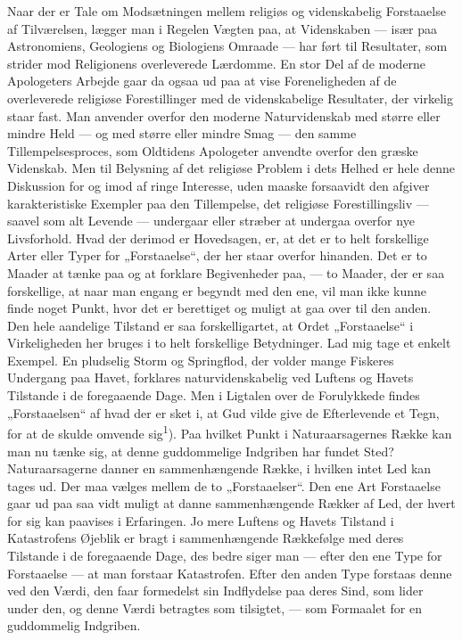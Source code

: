 \documentclass[12pt,a4paper,openany]{book}
\newcommand{\opage}[1]{\marginnote{\footnotesize\textit{[#1]}}}
\begin{document}
Naar der er Tale om Modsætningen mellem religiøs og videnskabelig
Forstaaelse af Tilværelsen, lægger man i Regelen Vægten paa, at
Videnskaben --- især paa Astronomiens, Geologiens og Biologiens Omraade
--- har ført til Resultater, som strider mod Religionens overleverede
Lærdomme. En stor Del af de moderne Apologeters Arbejde gaar da ogsaa ud
paa at vise Foreneligheden af de overleverede religiøse Forestillinger
med de videnskabelige Resultater, der virkelig staar fast. Man anvender
overfor den moderne Naturvidenskab med større eller mindre Held --- og
med større eller mindre Smag --- den samme Tillempelsesproces, som
Oldtidens Apologeter anvendte overfor den græske Videnskab. Men til
Belysning af det religiøse Problem i dets Helhed er hele denne
Diskussion for og imod af ringe Interesse, uden maaske forsaavidt den
afgiver karakteristiske Exempler paa den Tillempelse, det religiøse
Forestillingsliv --- saavel som alt Levende --- undergaar eller stræber
at undergaa overfor nye Livsforhold. Hvad der derimod er Hovedsagen, er,
at det er to helt forskellige Arter eller Typer for „Forstaaelse“, der
her staar overfor hinanden. Det er to Maader at tænke paa og at forklare
Begivenheder paa, --- to Maader, der er saa forskellige, at naar man
engang er begyndt med den ene, vil man ikke kunne finde noget Punkt,
hvor det er berettiget og muligt
\opage{17}at gaa over til den anden. Den hele aandelige Tilstand er saa
forskelligartet, at Ordet „Forstaaelse“ i Virkeligheden her bruges i to
helt forskellige Betydninger. Lad mig tage et enkelt Exempel. En
pludselig Storm og Springflod, der volder mange Fiskeres Undergang paa
Havet, forklares naturvidenskabelig ved Luftens og Havets Tilstande i de
foregaaende Dage. Men i Ligtalen over de Forulykkede findes
„Forstaaelsen“ af hvad der er sket i, at Gud vilde give de Efterlevende
et Tegn, for at de skulde omvende sig\textsuperscript{1}). Paa hvilket
Punkt i Naturaarsagernes Række kan man nu tænke sig, at denne
guddommelige Indgriben har fundet Sted? Naturaarsagerne danner en
sammenhængende Række, i hvilken intet Led kan tages ud. Der maa vælges
mellem de to „Forstaaelser“. Den ene Art Forstaaelse gaar ud paa saa
vidt muligt at danne sammenhængende Rækker af Led, der hvert for sig kan
paavises i Erfaringen. Jo mere Luftens og Havets Tilstand i Katastrofens
Øjeblik er bragt i sammenhængende Rækkefølge med deres Tilstande i de
foregaaende Dage, des bedre siger man --- efter den ene Type for
Forstaaelse --- at man forstaar Katastrofen. Efter den anden Type
forstaas denne ved den Værdi, den faar formedelst sin Indflydelse paa
deres Sind, som lider under den, og denne Værdi betragtes som tilsigtet,
--- som Formaalet for en guddommelig Indgriben.
\end{document}
